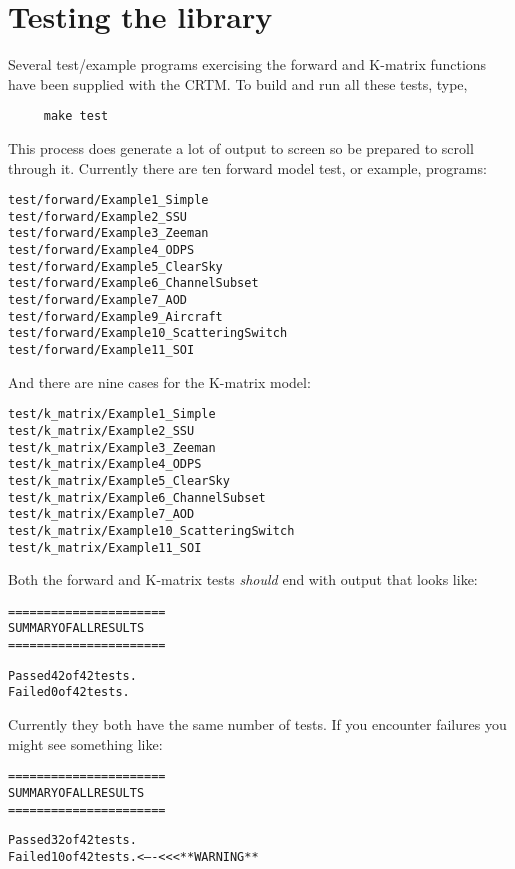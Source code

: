 \section{Testing the library}
Several test/example programs exercising the forward and K-matrix functions have been supplied with the CRTM. To build and run all these tests, type,

\begin{verbatim}     make test\end{verbatim}
   
This process does generate a lot of output to screen so be prepared to scroll through it. Currently there are ten forward model test, or example, programs:
\begin{alltt}
  test/forward/Example1_Simple
  test/forward/Example2_SSU
  test/forward/Example3_Zeeman
  test/forward/Example4_ODPS
  test/forward/Example5_ClearSky
  test/forward/Example6_ChannelSubset
  test/forward/Example7_AOD
  test/forward/Example9_Aircraft
  test/forward/Example10_ScatteringSwitch
  test/forward/Example11_SOI\end{alltt}
And there are nine cases for the K-matrix model:
\begin{alltt}
  test/k_matrix/Example1_Simple
  test/k_matrix/Example2_SSU
  test/k_matrix/Example3_Zeeman
  test/k_matrix/Example4_ODPS
  test/k_matrix/Example5_ClearSky
  test/k_matrix/Example6_ChannelSubset
  test/k_matrix/Example7_AOD
  test/k_matrix/Example10_ScatteringSwitch
  test/k_matrix/Example11_SOI\end{alltt}

Both the forward and K-matrix tests \emph{should} end with output that looks like:

\begin{alltt}
  ======================
  SUMMARY OF ALL RESULTS
  ======================

  Passed 42 of 42 tests.
  Failed 0 of 42 tests.\end{alltt}

Currently they both have the same number of tests. If you encounter failures you might see something like:

\begin{alltt}
  ======================
  SUMMARY OF ALL RESULTS
  ======================

  Passed 32 of 42 tests.
  Failed 10 of 42 tests.  <----<<<  **WARNING**\end{alltt}

